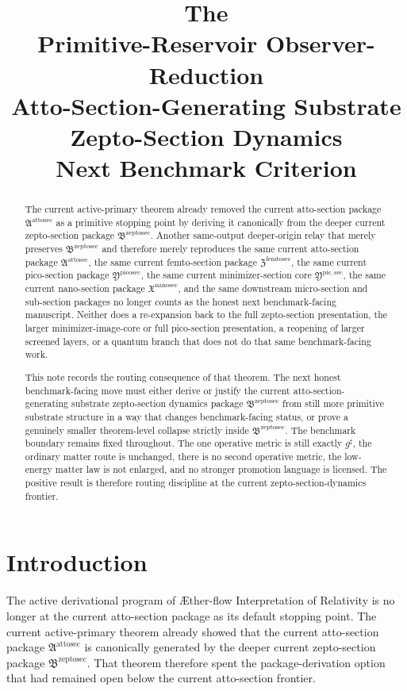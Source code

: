 \documentclass[11pt]{article}
\title{\textbf{The \TheoryName{}}\\[0.4em]
\large Primitive-Reservoir Observer-Reduction\\
\large Atto-Section-Generating Substrate Zepto-Section Dynamics\\
\large Next Benchmark Criterion}
\author{}
\date{}
\newcommand{\Aflow}{\AE{}ther-flow}
\newcommand{\TheoryName}{\Aflow{} Interpretation of Relativity}
\newcommand{\CompletedMetric}{g^{\sharp}}
\newcommand{\NanoSectionPackage}{\mathfrak X^{\mathrm{nanosec}}}
\newcommand{\PicoSectionPackage}{\mathfrak Y^{\mathrm{picosec}}}
\newcommand{\PicoMinSectionCore}{\mathfrak Y^{\mathrm{pic,sec}}}
\newcommand{\FemtoSectionPackage}{\mathfrak Z^{\mathrm{femtosec}}}
\newcommand{\AttoSectionPackage}{\mathfrak A^{\mathrm{attosec}}}
\newcommand{\ZeptoSectionPackage}{\mathfrak B^{\mathrm{zeptosec}}}
\begin{document}
\maketitle

\begin{abstract}
The current active-primary theorem already removed the current atto-section package \(\AttoSectionPackage\) as a primitive stopping point by deriving it canonically from the deeper current zepto-section package \(\ZeptoSectionPackage\). Another same-output deeper-origin relay that merely preserves \(\ZeptoSectionPackage\) and therefore merely reproduces the same current atto-section package \(\AttoSectionPackage\), the same current femto-section package \(\FemtoSectionPackage\), the same current pico-section package \(\PicoSectionPackage\), the same current minimizer-section core \(\PicoMinSectionCore\), the same current nano-section package \(\NanoSectionPackage\), and the same downstream micro-section and sub-section packages no longer counts as the honest next benchmark-facing manuscript. Neither does a re-expansion back to the full zepto-section presentation, the larger minimizer-image-core or full pico-section presentation, a reopening of larger screened layers, or a quantum branch that does not do that same benchmark-facing work.

This note records the routing consequence of that theorem. The next honest benchmark-facing move must either derive or justify the current atto-section-generating substrate zepto-section dynamics package \(\ZeptoSectionPackage\) from still more primitive substrate structure in a way that changes benchmark-facing status, or prove a genuinely smaller theorem-level collapse strictly inside \(\ZeptoSectionPackage\). The benchmark boundary remains fixed throughout. The one operative metric is still exactly \(\CompletedMetric\), the ordinary matter route is unchanged, there is no second operative metric, the low-energy matter law is not enlarged, and no stronger promotion language is licensed. The positive result is therefore routing discipline at the current zepto-section-dynamics frontier.
\end{abstract}

\section{Introduction}

The active derivational program of \TheoryName{} is no longer at the current atto-section package as its default stopping point. The current active-primary theorem already showed that the current atto-section package \(\AttoSectionPackage\) is canonically generated by the deeper current zepto-section package \(\ZeptoSectionPackage\). That theorem therefore spent the package-derivation option that had remained open below the current atto-section frontier.
\end{document}
